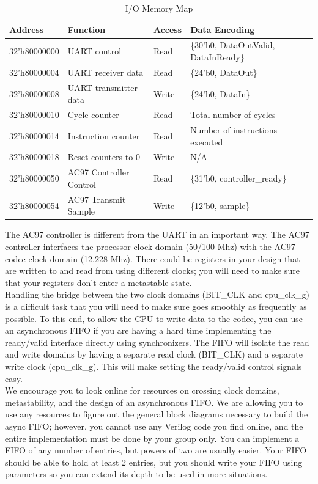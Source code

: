 \documentclass[11pt]{article}
\begin{document}
\begin{table}[hbt]
	\begin{center}
		\caption{I/O Memory Map}
		\label{mem_map2}
		\begin{tabular}{l l l l}
			\toprule
			\textbf{Address} & \textbf{Function} & \textbf{Access} & \textbf{Data Encoding}\\
			\midrule
			32'h80000000 & UART control & Read & \{30'b0, DataOutValid, DataInReady\} \\
			32'h80000004 & UART receiver data & Read & \{24'b0, DataOut\} \\
			32'h80000008 & UART transmitter data & Write & \{24'b0, DataIn\} \\
			\midrule
			32'h80000010 & Cycle counter & Read & Total number of cycles \\
			32'h80000014 & Instruction counter & Read & Number of instructions executed \\
			32'h80000018 & Reset  counters to 0 & Write & N/A \\
			\midrule
			32'h80000050 & AC97 Controller Control & Read & \{31'b0, controller\_ready\} \\
			32'h80000054 & AC97 Transmit Sample & Write & \{12'b0, sample\} \\ \bottomrule
		\end{tabular}
	\end{center}
\end{table}

The AC97 controller is different from the UART in an important way. The AC97 controller interfaces the processor clock domain (50/100 Mhz) with the AC97 codec clock domain (12.228 Mhz). There could be registers in your design that are written to and read from using different clocks; you will need to make sure that your registers don't enter a metastable state.\\

Handling the bridge between the two clock domains (BIT\_CLK and cpu\_clk\_g) is a difficult task that you will need to make sure goes smoothly as frequently as possible. To this end, to allow the CPU to write data to the codec, you can use an asynchronous FIFO if you are having a hard time implementing the ready/valid interface directly using synchronizers. The FIFO will isolate the read and write domains by having a separate read clock (BIT\_CLK) and a separate write clock (cpu\_clk\_g). This will make setting the ready/valid control signals easy.\\

We encourage you to look online for resources on crossing clock domains, metastability, and the design of an asynchronous FIFO. We are allowing you to use any resources to figure out the general block diagrams necessary to build the async FIFO; however, you cannot use any Verilog code you find online, and the entire implementation must be done by your group only. You can implement a FIFO of any number of entries, but powers of two are usually easier. Your FIFO should be able to hold at least 2 entries, but you should write your FIFO using parameters so you can extend its depth to be used in more situations.\\
\end{document}
